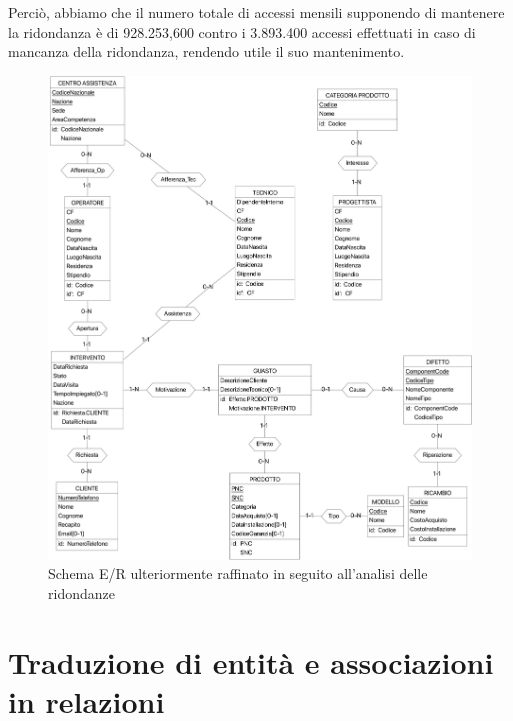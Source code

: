 \documentclass[a4paper, 12pt]{report}
\begin{document}
\newpage

Perciò, abbiamo che il numero totale di accessi mensili supponendo di mantenere la ridondanza è di 928.253,600 contro i 3.893.400 accessi effettuati in caso di mancanza della
ridondanza, rendendo utile il suo mantenimento.

\begin{figure}[H]
	\centering
	\includegraphics[width=\linewidth]{images/Unredundant.png}
	\caption{Schema E/R ulteriormente raffinato in seguito all'analisi delle ridondanze}
\end{figure}

\section{Traduzione di entità e associazioni in relazioni}
\end{document}
